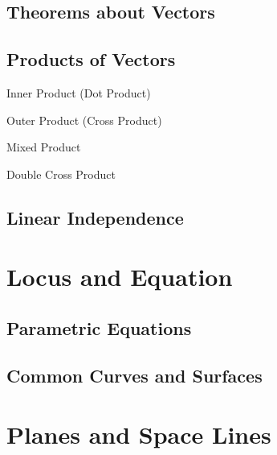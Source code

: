 \documentclass[11pt]{../../TexTemplate/elegantbook} %
\begin{document}
\section{Theorems about Vectors}

\section{Products of Vectors} %
\begin{leftbarTitle}{Inner Product (Dot Product)}\end{leftbarTitle} %

\begin{leftbarTitle}{Outer Product (Cross Product)}\end{leftbarTitle} %

\begin{leftbarTitle}{Mixed Product}\end{leftbarTitle} %

\begin{leftbarTitle}{Double Cross Product}\end{leftbarTitle} %

\section{Linear Independence}

\chapter{Locus and Equation}
\section{Parametric Equations}

\section{Common Curves and Surfaces}

\chapter{Planes and Space Lines}
\end{document}
